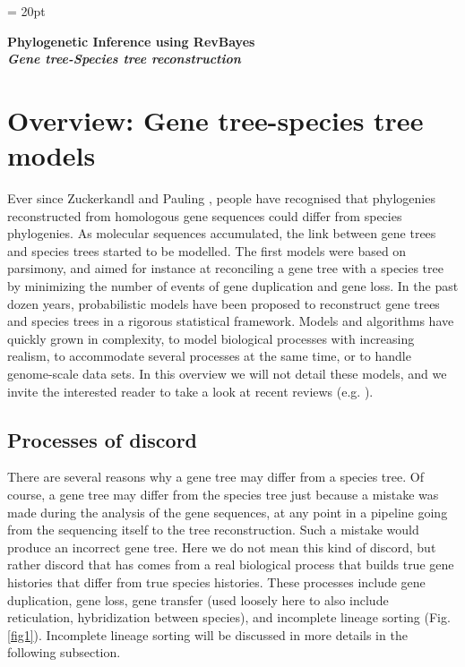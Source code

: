 \documentclass[11pt]{article}
\begin{document}
\renewcommand{\headrulewidth}{0.5pt}
\headsep = 20pt
\lhead{ }

\thispagestyle{plain}
\begin{center}

\textbf{\LARGE Phylogenetic Inference using RevBayes}\\\vspace{2mm}
\textbf{\it{\Large Gene tree-Species tree reconstruction}}\\\vspace{2mm}
\end{center}

\tableofcontents

\section{Overview: Gene tree-species tree models}

Ever since Zuckerkandl and Pauling \citep{Zuckerkandl1965a}, people have recognised that phylogenies reconstructed from homologous gene sequences could differ from species phylogenies.
As molecular sequences accumulated, the link between gene trees and species trees started to be modelled. 
The first models were based on parsimony, and aimed for instance at reconciling a gene tree with a species tree by minimizing the number of events of gene duplication and gene loss. 
In the past dozen years, probabilistic models have been proposed to reconstruct gene trees and species trees in a rigorous statistical framework.
Models and algorithms have quickly grown in complexity, to model biological processes with increasing realism, to accommodate several processes at the same time, or to handle genome-scale data sets.
In this overview we will not detail these models, and we invite the interested reader to take a look at recent reviews (e.g. \citep{Szollosi28072014}).

\subsection{Processes of discord}
There are several reasons why a gene tree may differ from a species tree. 
Of course, a gene tree may differ from the species tree just because a mistake was made during the analysis of the gene sequences, at any point in a pipeline going from the sequencing itself to the tree reconstruction.
Such a mistake would produce an incorrect gene tree.
Here we do not mean this kind of discord, but rather discord that has comes from a real biological process that builds true gene histories that differ from true species histories.
These processes include gene duplication, gene loss, gene transfer (used loosely here to also include reticulation, hybridization between species), and incomplete lineage sorting (Fig. \ref{fig1}). 
Incomplete lineage sorting will be discussed in more details in the following subsection.
\end{document}

